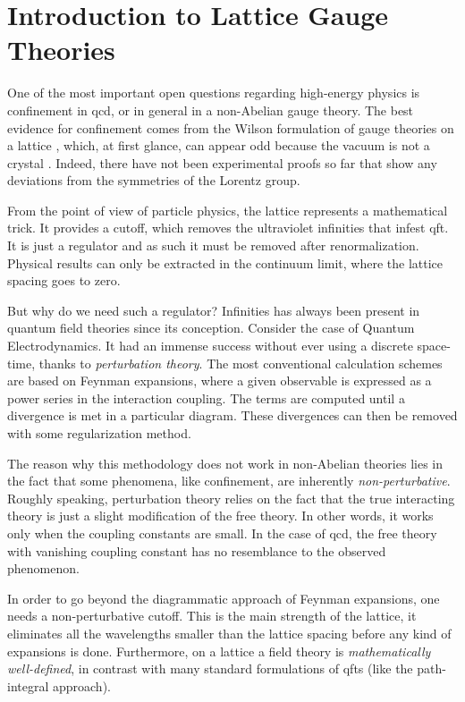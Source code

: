 \chapter{Introduction to Lattice Gauge Theories}
\label{chap:introduction_to_lattice_gauge_theories}

One of the most important open questions regarding high-energy physics is confinement in \ac{qcd}, or in general in a non-Abelian gauge theory.
The best evidence for confinement comes from the Wilson formulation of gauge theories on a lattice \cite{wilson1974confinement}, which, at first glance, can appear odd because the vacuum is not a crystal \cite{creutz1985book}.
Indeed, there have not been experimental proofs so far that show any deviations from the symmetries of the Lorentz group.

From the point of view of particle physics, the lattice represents a mathematical trick.
It provides a cutoff, which removes the ultraviolet infinities that infest \ac{qft}.
It is just a regulator and as such it must be removed after renormalization.
Physical results can only be extracted in the continuum limit, where the lattice spacing goes to zero.

But why do we need such a regulator?
Infinities has always been present in quantum field theories since its conception.
Consider the case of Quantum Electrodynamics.
It had an immense success without ever using a discrete space-time, thanks to \emph{perturbation theory}.
The most conventional calculation schemes are based on Feynman expansions,
where a given observable is expressed as a power series in the interaction coupling.
The terms are computed until a divergence is met in a particular diagram.
These divergences can then be removed with some regularization method.

The reason why this methodology does not work in non-Abelian theories lies in the fact that some phenomena, like confinement, are inherently \emph{non-perturbative}.
Roughly speaking, perturbation theory relies on the fact that the true interacting theory is just a slight modification of the free theory.
In other words, it works only when the coupling constants are small.
In the case of \ac{qcd}, the free theory with vanishing coupling constant has no resemblance to the observed phenomenon.

In order to go beyond the diagrammatic approach of Feynman expansions, one needs a non-perturbative cutoff.
This is the main strength of the lattice, it eliminates all the wavelengths smaller than the lattice spacing before any kind of expansions is done.
Furthermore, on a lattice a field theory is \emph{mathematically well-defined}, in contrast with many standard formulations of \ac{qft}s (like the path-integral approach).

